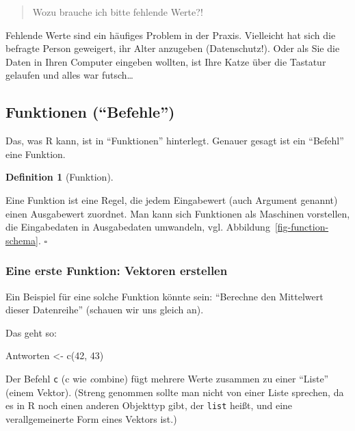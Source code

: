 \documentclass[
  a4paper,
]{scrbook}
\newenvironment{Shaded}{\begin{snugshade}}{\end{snugshade}}
\newcommand{\DecValTok}[1]{\textcolor[rgb]{0.68,0.00,0.00}{#1}}
\newcommand{\FunctionTok}[1]{\textcolor[rgb]{0.28,0.35,0.67}{#1}}
\newcommand{\NormalTok}[1]{\textcolor[rgb]{0.00,0.23,0.31}{#1}}
\newcommand{\OtherTok}[1]{\textcolor[rgb]{0.00,0.23,0.31}{#1}}
\theoremstyle{definition}
\theoremstyle{definition}
\newtheorem{definition}{Definition}[chapter]
\theoremstyle{definition}
\theoremstyle{remark}
\begin{document}
\begin{quote}
{} Wozu brauche ich bitte fehlende Werte?!
\end{quote}

Fehlende Werte sind ein häufiges Problem in der Praxis. Vielleicht hat
sich die befragte Person geweigert, ihr Alter anzugeben (Datenschutz!).
Oder als Sie die Daten in Ihren Computer eingeben wollten, ist Ihre
Katze über die Tastatur gelaufen und alles war futsch\ldots{}

\subsection{Funktionen (``Befehle'')}\label{funktionen-befehle}

Das, was R kann, ist in ``Funktionen'' hinterlegt. Genauer gesagt ist
ein ``Befehl'' eine Funktion.

\begin{definition}[Funktion]\protect\hypertarget{def-fun}{}\label{def-fun}

Eine Funktion ist eine Regel, die jedem Eingabewert (auch Argument
genannt) einen Ausgabewert zuordnet. Man kann sich Funktionen als
Maschinen vorstellen, die Eingabedaten in Ausgabedaten umwandeln, vgl.
Abbildung~\ref{fig-function-schema}. \(\square\)

\end{definition}

\subsubsection{Eine erste Funktion: Vektoren
erstellen}\label{eine-erste-funktion-vektoren-erstellen}

Ein Beispiel für eine solche Funktion könnte sein: ``Berechne den
Mittelwert dieser Datenreihe'' (schauen wir uns gleich an).

Das geht so:

\begin{Shaded}
\begin{Highlighting}[]
\NormalTok{Antworten }\OtherTok{\textless{}{-}} \FunctionTok{c}\NormalTok{(}\DecValTok{42}\NormalTok{, }\DecValTok{43}\NormalTok{)}
\end{Highlighting}
\end{Shaded}

Der Befehl \texttt{c} (c wie \emph{c}ombine) fügt mehrere Werte zusammen
zu einer ``Liste'' (einem Vektor). (Streng genommen sollte man nicht von
einer Liste sprechen, da es in R noch einen anderen Objekttyp gibt, der
\texttt{list} heißt, und eine verallgemeinerte Form eines Vektors ist.)
\end{document}
